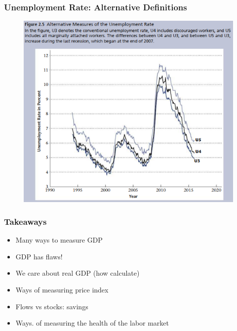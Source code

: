 \documentclass{beamer}
\begin{document}
\begin{frame}
\frametitle[alignment=center]{Unemployment Rate: Alternative Definitions}
\begin{figure}
\includegraphics[scale=0.45]{Figures/W_Fig_2pt5.png}
\end{figure}
\end{frame}




\begin{frame}
\frametitle[alignment=center]{Takeaways}
\begin{itemize}
\item Many ways to measure GDP
\bigskip
\item GDP has flaws!
\bigskip
\item We care about real GDP (how calculate)
\bigskip
\item Ways of measuring price index
\bigskip
\item Flows vs stocks: savings
\bigskip
\item  Ways. of measuring the health of the labor market
\end{itemize}
\end{frame}
\end{document}
